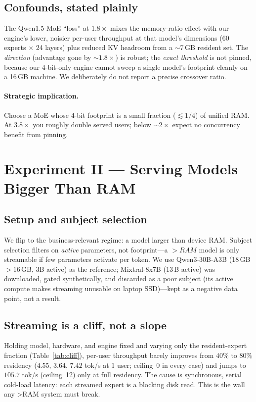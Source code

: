 \documentclass[11pt]{article}
\newcommand{\ppl}{\ensuremath{\times}}
\begin{document}
\subsection{Confounds, stated plainly}
The Qwen1.5-MoE ``loss'' at $1.8\ppl$ mixes the memory-ratio effect with our engine's
lower, noisier per-user throughput at that model's dimensions (60 experts $\times$ 24
layers) plus reduced KV headroom from a ${\sim}$7\,GB resident set. The \emph{direction}
(advantage gone by ${\sim}1.8\ppl$) is robust; the \emph{exact threshold} is not pinned,
because our 4-bit-only engine cannot sweep a single model's footprint cleanly on a 16\,GB
machine. We deliberately do not report a precise crossover ratio.

\paragraph{Strategic implication.} Choose a MoE whose 4-bit footprint is a small
fraction ($\lesssim 1/4$) of unified RAM. At $3.8\ppl$ you roughly double served users;
below ${\sim}2\ppl$ expect no concurrency benefit from pinning.

\section{Experiment II --- Serving Models Bigger Than RAM}
\label{sec:beyond}

\subsection{Setup and subject selection}
We flip to the business-relevant regime: a model larger than device RAM. Subject
selection filters on \emph{active} parameters, not footprint---a $>RAM$ model is only
streamable if few parameters activate per token. We use Qwen3-30B-A3B (18\,GB $>16$\,GB,
$3$B active) as the reference; Mixtral-8x7B (13\,B active) was downloaded, gated
synthetically, and discarded as a poor subject (its active compute makes streaming
unusable on laptop SSD)---kept as a negative data point, not a result.

\subsection{Streaming is a cliff, not a slope}
Holding model, hardware, and engine fixed and varying only the resident-expert fraction
(Table~\ref{tab:cliff}), per-user throughput barely improves from 40\% to 80\% residency
($4.55$, $3.64$, $7.42$ tok/s at 1 user; ceiling~0 in every case) and jumps to $105.7$
tok/s (ceiling~12) only at full residency. The cause is synchronous, serial
cold-load latency: each streamed expert is a blocking disk read. This is the wall any
>RAM system must break.
\end{document}
